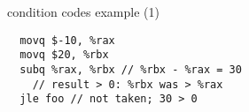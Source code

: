 \begin{frame}[fragile,label=ccEx1]{condition codes example (1)}
\begin{lstlisting}
  movq $-10, %rax
  movq $20, %rbx
  subq %rax, %rbx // %rbx - %rax = 30
    // result > 0: %rbx was > %rax
  jle foo // not taken; 30 > 0
\end{lstlisting}
\end{frame}


